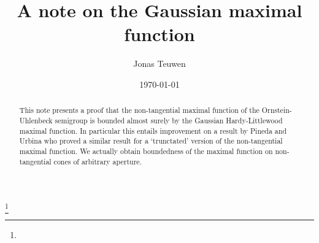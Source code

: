 \documentclass{amsart}
\theoremstyle{remark}
\begin{document}
\title[Gaussian maximal functions]{A note on the Gaussian maximal
  function}



\author{Jonas Teuwen}%
\address{Delft Institute of Applied Mathematics,
  Delft University of Technology, P.O. Box 5031, 2600 GA Delft, The
  Netherlands}%
%
%
\thanks{}%
\date{\today}

\maketitle

\begin{abstract}
  This note presents a proof that the non-tangential maximal function of the
  Ornstein-Uhlenbeck semigroup is bounded almost surely by the Gaussian
  Hardy-Littlewood maximal function.  In particular this entails improvement on
  a result by Pineda and Urbina \cite{Pineda2008} who proved a similar result
  for a `trunctated' version of the non-tangential maximal function. We
  actually obtain boundedness of the maximal function on non-tangential cones
  of arbitrary aperture.
\end{abstract}


\maketitle
\end{document}
